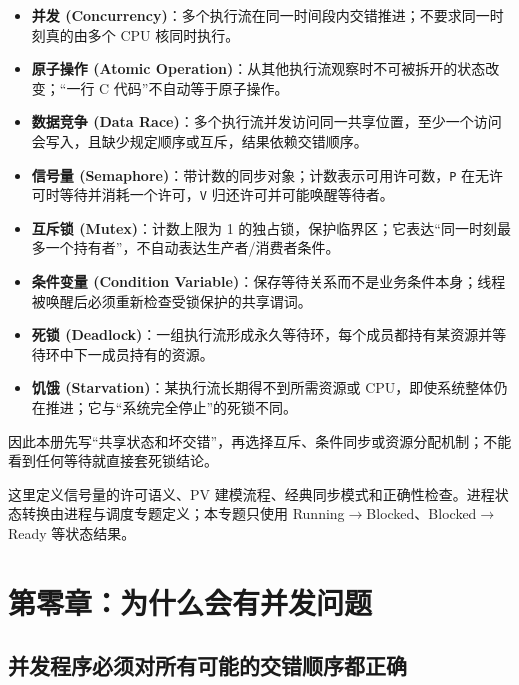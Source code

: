 \documentclass[11pt,a4paper]{ctexart}
\newcommand{\kw}[1]{\textbf{#1}}
\newcommand{\code}[1]{\texttt{#1}}
\begin{document}
\begin{method}
\begin{itemize}[leftmargin=1.5em]
  \item \kw{并发 (Concurrency)}：多个执行流在同一时间段内交错推进；不要求同一时刻真的由多个 CPU 核同时执行。
  \item \kw{原子操作 (Atomic Operation)}：从其他执行流观察时不可被拆开的状态改变；“一行 C 代码”不自动等于原子操作。
  \item \kw{数据竞争 (Data Race)}：多个执行流并发访问同一共享位置，至少一个访问会写入，且缺少规定顺序或互斥，结果依赖交错顺序。
  \item \kw{信号量 (Semaphore)}：带计数的同步对象；计数表示可用许可数，\code{P} 在无许可时等待并消耗一个许可，\code{V} 归还许可并可能唤醒等待者。
  \item \kw{互斥锁 (Mutex)}：计数上限为 1 的独占锁，保护临界区；它表达“同一时刻最多一个持有者”，不自动表达生产者/消费者条件。
  \item \kw{条件变量 (Condition Variable)}：保存等待关系而不是业务条件本身；线程被唤醒后必须重新检查受锁保护的共享谓词。
  \item \kw{死锁 (Deadlock)}：一组执行流形成永久等待环，每个成员都持有某资源并等待环中下一成员持有的资源。
  \item \kw{饥饿 (Starvation)}：某执行流长期得不到所需资源或 CPU，即使系统整体仍在推进；它与“系统完全停止”的死锁不同。
\end{itemize}
因此本册先写“共享状态和坏交错”，再选择互斥、条件同步或资源分配机制；不能看到任何等待就直接套死锁结论。
\end{method}

\begin{method}[内容边界]
这里定义信号量的许可语义、PV 建模流程、经典同步模式和正确性检查。进程状态转换由进程与调度专题定义；本专题只使用 Running$\to$Blocked、Blocked$\to$Ready 等状态结果。
\end{method}

\tableofcontents
\newpage

\section{第零章：为什么会有并发问题}

\subsection{并发程序必须对所有可能的交错顺序都正确}
\end{document}
